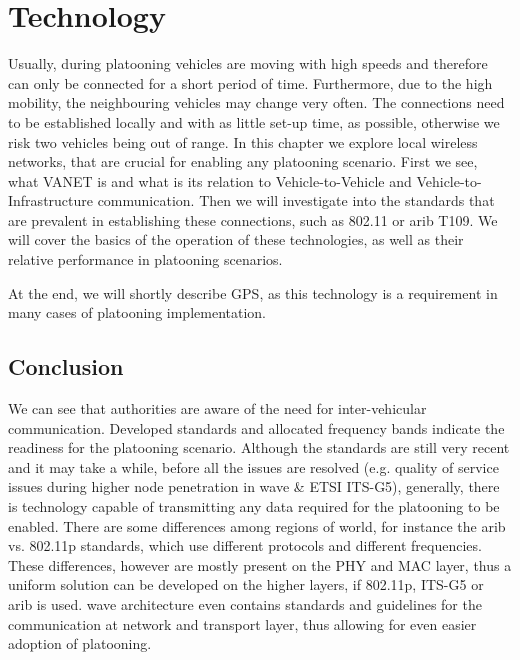 \section{Technology}\label{sec:technology}

Usually, during platooning vehicles are moving with high speeds and therefore can only be connected for a short period of time. Furthermore, due to the high mobility, the neighbouring vehicles may change very often. The connections need to be established locally and with as little set-up time, as possible, otherwise we risk two vehicles being out of range. In this chapter we explore local wireless networks, that are crucial for enabling any platooning scenario. First we see, what \acrshort{VANET} is and what is its relation to Vehicle-to-Vehicle and Vehicle-to-Infrastructure communication. Then we will investigate into the standards that are prevalent in establishing these connections, such as 802.11 or \acrshort{arib} T109. We will cover the basics of the operation of these technologies, as well as their relative performance in platooning scenarios.\par
% 
At the end, we will shortly describe \acrshort{GPS}, as this technology is a requirement in many cases of platooning implementation.









\subsection{Conclusion}

We can see that authorities are aware of the need for inter-vehicular communication. Developed standards and allocated frequency bands indicate the readiness for the platooning scenario. Although the standards are still very recent and it may take a while, before all the issues are resolved (e.g. quality of service issues during higher node penetration in \acrshort{wave} \& \acrshort{ETSI} ITS-G5), generally, there is technology capable of transmitting any data required for the platooning to be enabled. There are some differences among regions of world, for instance the \acrshort{arib} vs. 802.11p standards, which use different protocols and different frequencies. These differences, however are mostly present on the \acrshort{PHY} and \acrshort{MAC} layer, thus a uniform solution can be developed on the higher layers, if 802.11p, ITS-G5 or \acrshort{arib} is used. \acrshort{wave} architecture even contains standards and guidelines for the communication at network and transport layer, thus allowing for even easier adoption of platooning.